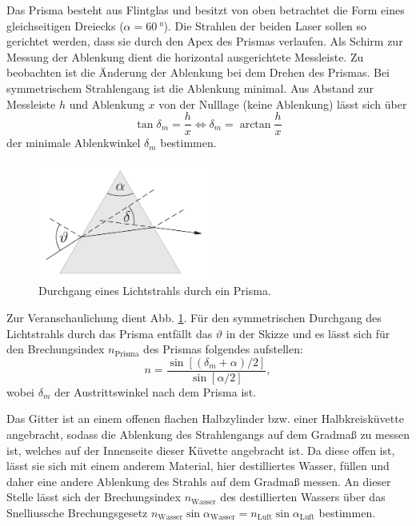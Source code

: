 			Das Prisma besteht aus Flintglas und besitzt von oben betrachtet die Form eines gleichseitigen Dreiecks ($\alpha = \SI{60}{\degree}$).
			Die Strahlen der beiden Laser sollen so gerichtet werden, dass sie durch den Apex des Prismas verlaufen. %
			Als Schirm zur Messung der Ablenkung dient die horizontal ausgerichtete Messleiste.
			Zu beobachten ist die Änderung der Ablenkung bei dem Drehen des Prismas. %
			Bei symmetrischem Strahlengang ist die Ablenkung minimal.
			Aus Abstand zur Messleiste $h$ und Ablenkung $x$ von der Nulllage (keine Ablenkung) lässt sich über
			\begin{equation} \label{eq:Winkler}
				\tan \delta_m = \frac{h}{x} \Leftrightarrow \delta_m = \arctan \frac{h}{x}
			\end{equation}
			der minimale Ablenkwinkel $\delta_m$ bestimmen.
			\begin{figure}[ht]
				\centering
				\includegraphics[width=0.5\textwidth]{bilder/prisma.png}
				\caption{Durchgang eines Lichtstrahls durch ein Prisma.\cite{WWU}}
				\label{fig:Prisma}	
			\end{figure}
			Zur Veranschaulichung dient Abb. \ref{fig:Prisma}.
			Für den symmetrischen Durchgang des Lichtstrahls durch das Prisma entfällt das $\vartheta$ in der Skizze und  es lässt sich für den Brechungsindex $n_\text{Prisma}$ des Prismas folgendes aufstellen:
			\begin{equation} \label{eq:nPrisma}
				n = \frac{\sin[(\delta_m + \alpha) / 2]}{\sin [\alpha / 2]},
			\end{equation} 
			wobei $\delta_m$ der Austrittswinkel nach dem Prisma ist.
			
			Das Gitter ist an einem offenen flachen Halbzylinder bzw. einer Halbkreisküvette angebracht, sodass die Ablenkung des Strahlengangs auf dem Gradmaß zu messen ist, welches auf der Innenseite dieser Küvette angebracht ist.
			Da diese offen ist, lässt sie sich mit einem anderem Material, hier destilliertes Wasser, füllen und daher eine andere Ablenkung des Strahls auf dem Gradmaß messen.
			An dieser Stelle lässt sich der Brechungsindex $n_\text{Wasser}$ des destillierten Wassers über das Snelliussche Brechungsgesetz $n_\text{Wasser} \sin \alpha_\text{Wasser} = n_\text{Luft} \sin \alpha_\text{Luft}$ bestimmen.
			
